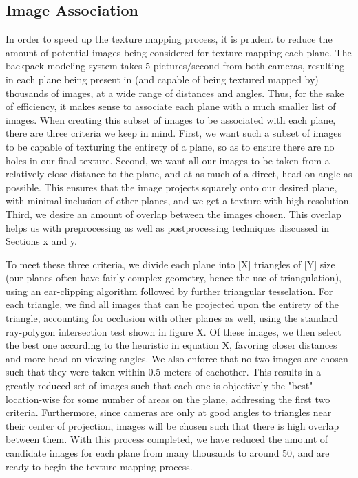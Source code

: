 \documentclass[10pt,twocolumn,letterpaper]{article}
\begin{document}
\subsection{Image Association}
\label{sec:imageAssociation}
In order to speed up the texture mapping process, it is prudent to
reduce the amount of potential images being considered for texture
mapping each plane. The backpack modeling system takes 5
pictures/second from both cameras, resulting in each plane being
present in (and capable of being textured mapped by) thousands of
images, at a wide range of distances and angles. Thus, for the sake
of efficiency, it makes sense to associate each plane with a much
smaller list of images. When creating this subset of images to be associated with each
plane, there are three criteria we keep in mind. First, we want such a
subset of images to be capable of texturing the entirety of a plane,
so as to ensure there are no holes in our final texture. Second, we
want all our images to be taken from a relatively close distance to
the plane, and at as much of a direct, head-on angle as possible. This
ensures that the image projects squarely onto our desired plane, with
minimal inclusion of other planes, and we get a texture with high
resolution. Third, we desire an amount of overlap between the images
chosen. This overlap helps us with preprocessing as well as
postprocessing techniques discussed in Sections x and y.

To meet these three criteria, we divide each plane into [X] triangles
of [Y] size (our planes often have fairly complex geometry, hence the
use of triangulation), using an ear-clipping algorithm followed by
further triangular tesselation. For each triangle, we find all images
that can be projected upon the entirety of the triangle, accounting
for occlusion with other planes as well, using the standard
ray-polygon intersection test shown in figure X. Of these images, we
then select the best one according to the heuristic in equation X,
favoring closer distances and more head-on viewing angles. We also
enforce that no two images are chosen such that they were taken within
0.5 meters of eachother. This results in a greatly-reduced set of
images such that each one is objectively the "best" location-wise for
some number of areas on the plane, addressing the first two
criteria. Furthermore, since cameras are only at good angles to
triangles near their center of projection, images will be chosen such
that there is high overlap between them. With this process completed,
we have reduced the amount of candidate images for each plane from
many thousands to around 50, and are ready to begin the texture
mapping process.
\end{document}
